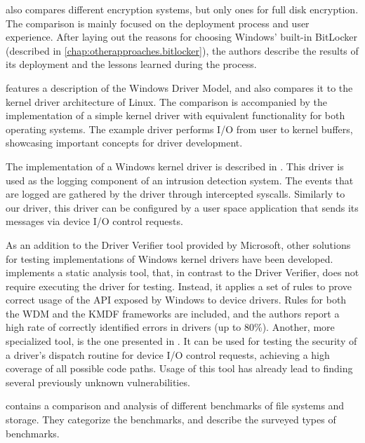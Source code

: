 \cite{Lewis2018} also compares different encryption systems, but only ones for full disk encryption. The comparison is mainly focused on the deployment process and user experience. After laying out the reasons for choosing Windows' built-in BitLocker (described in \autoref{chap:otherapproaches.bitlocker}), the authors describe the results of its deployment and the lessons learned during the process.

\cite{Tsegaye2004} features a description of the Windows Driver Model, and also compares it to the kernel driver architecture of Linux. The comparison is accompanied by the implementation of a simple kernel driver with equivalent functionality for both operating systems. The example driver performs I/O from user to kernel buffers, showcasing important concepts for driver development.

The implementation of a Windows kernel driver is described in \cite{Battistoni2008}. This driver is used as the logging component of an intrusion detection system. The events that are logged are gathered by the driver through intercepted syscalls. Similarly to our driver, this driver can be configured by a user space application that sends its messages via device I/O control requests.

As an addition to the Driver Verifier tool provided by Microsoft, other solutions for testing implementations of Windows kernel drivers have been developed. \cite{Ball2006} implements a static analysis tool, that, in contrast to the Driver Verifier, does not require executing the driver for testing. Instead, it applies a set of rules to prove correct usage of the API exposed by Windows to device drivers. Rules for both the WDM and the KMDF frameworks are included, and the authors report a high rate of correctly identified errors in drivers (up to 80\%). Another, more specialized tool, is the one presented in \cite{Ni2012}. It can be used for testing the security of a driver's dispatch routine for device I/O control requests, achieving a high coverage of all possible code paths. Usage of this tool has already lead to finding several previously unknown vulnerabilities.

\cite{Traeger2008} contains a comparison and analysis of different benchmarks of file systems and storage. They categorize the benchmarks, and describe the surveyed types of benchmarks.


